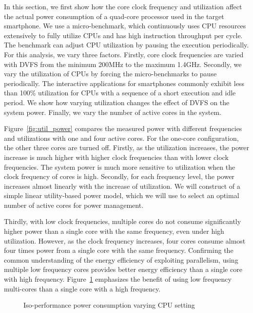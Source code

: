 In this section, we first show how the core clock frequency and utilization affect the actual power
consumption of a quad-core processor used in the target smartphone. 
We use a micro-benchmark, which continuously uses CPU resources extensively to fully utilize CPUs and has high instruction
throughput per cycle. The benchmark can adjust CPU utilization by pausing the execution periodically. 
For this analysis, we vary three factors. Firstly, core clock frequencies are varied with DVFS from
the minimum 200MHz to the maximum 1.4GHz. Secondly, we vary the utilization of CPUs by forcing
the micro-benchmarks to pause periodically. The interactive
applications for smartphones commonly exhibit less than 100\% utilization for CPUs with 
a sequence of a short execution and idle period. 
We show how varying utilization changes the effect of DVFS on the system power.
Finally, we vary the number of active cores in the system.

Figure~\ref{fig:util_power} compares the measured power with different frequencies and utilizations with
one and four active cores. For the one-core configuration, the other three cores are turned off.
Firstly, as the utilization increases, the power increase is much higher
with higher clock frequencies than with lower clock frequencies. The system power is much more sensitive to
utilization when the clock frequency of cores is high.
Secondly, for each frequency level, the power increases almost linearly with the increase of utilization.
We will construct of a simple linear utility-based power model, which we will use to select an optimal
number of active cores for power management.

Thirdly, with low clock frequencies,
multiple cores do not consume significantly higher power than a single core with the same frequency, even under high utilization.
However, as the clock frequency increases, four cores consume almost four times power from a single core with
the same frequency. Confirming the common understanding of the energy efficiency of exploiting parallelism, 
using multiple low frequency cores provides better energy efficiency than a single core with high frequency. 
Figure~\ref{fig:1cpu_vs_2cpu} emphasizes the benefit of using low frequency multi-cores than
a single core with a high frequency. 

\begin{figure}[bt]
\begin{center}
\end{center}
\caption{Iso-performance power consumption varying CPU setting}
\vspace{-0.1in}
\label{fig:1cpu_vs_2cpu}
\end{figure}


